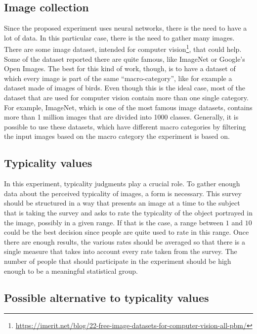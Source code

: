 \documentclass[conference]{IEEEtran}
\begin{document}
		\subsection{Image collection}
			
			\noindent Since the proposed experiment uses neural networks, there is the need to have a lot of data. In this particular case, there is the need to gather many images. There are some image dataset, intended for computer 
			vision\footnote{\url{https://imerit.net/blog/22-free-image-datasets-for-computer-vision-all-pbm/}}, that could help. Some of the dataset reported there are quite famous, like ImageNet or Google's Open Images. The 
			best for this kind of work, though, is to have a dataset of which every image is part of the same ``macro-category'', like for example a dataset made of images of birds. Even though this is the ideal case,
			most of the dataset that are used for computer vision contain more than one single category. For example, ImageNet, which is one of the most famous image datasets, contains more than 1 million images that are divided 
			into 1000 classes. Generally, it is possible to use these datasets, which have different macro categories by filtering the input images based on the macro category the experiment is based on.
		
		\subsection{Typicality values\label{sec:typval}}
			
			\noindent In this experiment, typicality judgments play a crucial role. To gather enough data about the perceived typicality of images, a form is necessary. This survey should be structured in a way that presents an 
			image at a time to the subject that is taking the survey and asks to rate the typicality of the object portrayed in the image, possibly in a given range. If that is the case, a range between $1$ and $10$ 
			could be the best decision since people are quite used to rate in this range. Once there are enough results, the various rates should be averaged so that there is a single measure that takes into 
			account every rate taken from the survey. The number of people that should participate in the experiment should be high enough to be a meaningful statistical group.
			
			
		\subsection{Possible alternative to typicality values\label{sec:patv}}
		
\end{document}
